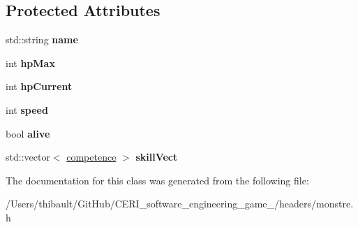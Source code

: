 \subsection*{Protected Attributes}
\begin{DoxyCompactItemize}
\item 
\mbox{\label{classmonstre_a477ba81185ff1dc77ebedf2b72afbb05}} 
std\+::string {\bfseries name}
\item 
\mbox{\label{classmonstre_a6cca6a9a3788ab7fca2e6ee7c321b7ea}} 
int {\bfseries hp\+Max}
\item 
\mbox{\label{classmonstre_afc39f2b9c79b34c7690886b9fd1f97f9}} 
int {\bfseries hp\+Current}
\item 
\mbox{\label{classmonstre_a2a118a2943476096ff05f0ddbee5a2eb}} 
int {\bfseries speed}
\item 
\mbox{\label{classmonstre_aca8671e46fd6e20fd0c1afeb276f6da4}} 
bool {\bfseries alive}
\item 
\mbox{\label{classmonstre_a6540a325121334ddbb8847cbf97f869a}} 
std\+::vector$<$ \hyperlink{classcompetence}{competence} $>$ {\bfseries skill\+Vect}
\end{DoxyCompactItemize}


The documentation for this class was generated from the following file\+:\begin{DoxyCompactItemize}
\item 
/\+Users/thibault/\+Git\+Hub/\+C\+E\+R\+I\+\_\+software\+\_\+engineering\+\_\+game\+\_/headers/monstre.\+h\end{DoxyCompactItemize}
